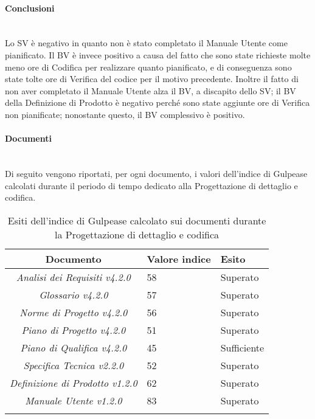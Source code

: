 \paragraph{Conclusioni} \hfill\\
Lo SV è negativo in quanto non è stato completato il Manuale Utente come pianificato.
Il BV è invece positivo a causa del fatto che sono state richieste molte meno ore di Codifica per realizzare quanto pianificato, e di conseguenza sono state tolte ore di Verifica del codice per il motivo precedente.
Inoltre il fatto di non aver completato il Manuale Utente alza il BV, a discapito dello SV; il BV della Definizione di Prodotto è negativo perché sono state aggiunte ore di Verifica non pianificate; nonostante questo, il BV complessivo è positivo.


\paragraph{Documenti} \hfill\\
Di seguito vengono riportati, per ogni documento, i valori dell'indice di Gulpease calcolati durante il periodo di tempo dedicato alla Progettazione di dettaglio e codifica.

\begin{longtable}{|c|p{3cm}|p{3cm}|}
\toprule
\textbf{Documento} & \textbf{Valore indice} & \textbf{Esito} \\


\midrule
\emph{Analisi dei Requisiti v4.2.0} & 58 & Superato \\
\midrule
\emph{Glossario v4.2.0} & 57 & Superato \\
\midrule
\emph{Norme di Progetto v4.2.0} & 56 & Superato \\
\midrule
\emph{Piano di Progetto v4.2.0} & 51 & Superato\\
\midrule
\emph{Piano di Qualifica v4.2.0} & 45 & Sufficiente \\
\midrule
\emph{Specifica Tecnica v2.2.0} & 52 & Superato\\
\midrule
\emph{Definizione di Prodotto v1.2.0} & 62 & Superato\\
\midrule
\emph{Manuale Utente v1.2.0} & 83 & Superato\\
\bottomrule
\caption{Esiti dell'indice di Gulpease calcolato sui documenti durante la Progettazione di dettaglio e codifica}
\label{tab:changelog}
\end{longtable}

